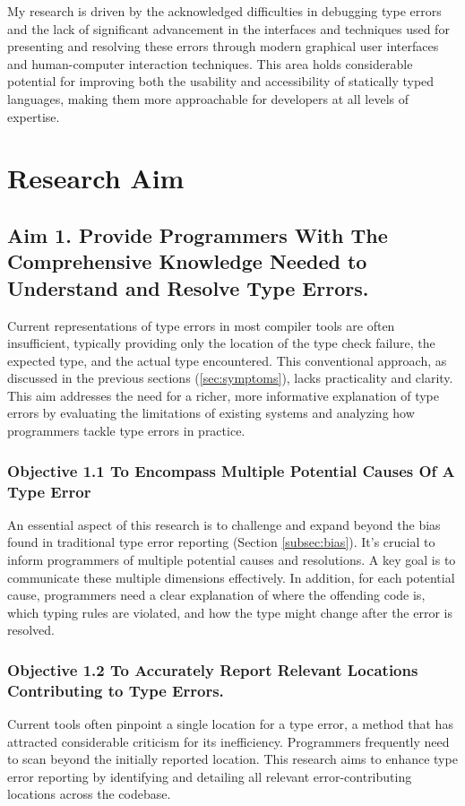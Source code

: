 My research is driven by the acknowledged difficulties in debugging type errors and the lack of significant advancement in the interfaces and techniques used for presenting and resolving these errors through modern graphical user interfaces and human-computer interaction techniques. This area holds considerable potential for improving both the usability and accessibility of statically typed languages, making them more approachable for developers at all levels of expertise.

\section{Research Aim}

\subsection{Aim 1. Provide Programmers With The Comprehensive Knowledge Needed to Understand and Resolve Type Errors.}
\label{subsec:aim1}

Current representations of type errors in most compiler tools are often insufficient, typically providing only the location of the type check failure, the expected type, and the actual type encountered. This conventional approach, as discussed in the previous sections (\ref{sec:symptoms}), lacks practicality and clarity. This aim addresses the need for a richer, more informative explanation of type errors by evaluating the limitations of existing systems and analyzing how programmers tackle type errors in practice.

\subsubsection{Objective 1.1 To Encompass Multiple Potential Causes Of A Type Error}
An essential aspect of this research is to challenge and expand beyond the bias found in traditional type error reporting (Section \ref{subsec:bias}). It's crucial to inform programmers of multiple potential causes and resolutions. A key goal is to communicate these multiple dimensions effectively. In addition, for each potential cause, programmers need a clear explanation of where the offending code is, which typing rules are violated, and how the type might change after the error is resolved.


\subsubsection{Objective 1.2 To Accurately Report Relevant Locations Contributing to Type Errors.}
Current tools often pinpoint a single location for a type error, a method that has attracted considerable criticism for its inefficiency. Programmers frequently need to scan beyond the initially reported location. This research aims to enhance type error reporting by identifying and detailing all relevant error-contributing locations across the codebase.

